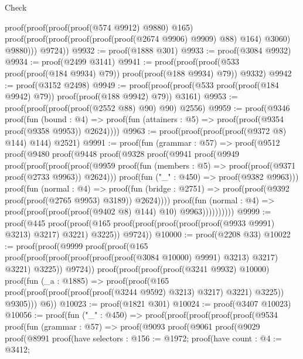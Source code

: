 \begin{lexlean}{Check}
\begin{coremodule}
            proof(proof(proof(proof(@574 @9912) @9880) @165)
                proof(proof(proof(proof(proof(proof(@2674 @9906) @9909) @88) @164) @3060) @9880)))
          @9724))
@9932 := proof(@1888 @301)
@9933 := proof(@3084 @9932)
@9934 := proof(@2499 @3141)
@9941 := proof(proof(proof(@533 proof(proof(@184 @9934) @79)) proof(proof(@188 @9934) @79)) @9332)
@9942 := proof(@3152 @2498)
@9949 := proof(proof(proof(@533 proof(proof(@184 @9942) @79)) proof(proof(@188 @9942) @79)) @3161)
@9953 := proof(proof(proof(proof(@2552 @88) @90) @90) @2556)
@9959 := proof(@9346
      proof(fun (bound : @4) =>
        proof(fun (attainers : @5) => proof(proof(@9354 proof(@9358 @9953)) @2624))))
@9963 := proof(proof(proof(proof(@9372 @8) @144) @144) @2521)
@9991 := proof(fun (grammar : @57) =>
    proof(@9512
        proof(@9480
            proof(@9448
                proof(@9328
                    proof(@9941
                        proof(@9949
                            proof(proof(proof(proof(@9959
                                      proof(fun (members : @5) =>
                                        proof(proof(@9371 proof(@2733 @9963)) @2624)))
                                    proof(fun ("_" : @450) => proof(@9382 @9963)))
                                  proof(fun (normal : @4) =>
                                    proof(fun (bridge : @2751) =>
                                      proof(proof(@9392 proof(proof(@2765 @9953) @3189)) @2624))))
                                proof(fun (normal : @4) =>
                                  proof(proof(proof(proof(@9402 @8) @144) @10) @9963))))))))))
@9999 := proof(@445
      proof(proof(@165 proof(proof(proof(proof(proof(@9933 @9991) @3213) @3217) @3221) @3225))
          @9724))
@10000 := proof(@2208 @33)
@10022 := proof(proof(@9999
        proof(proof(@165
              proof(proof(proof(proof(proof(proof(@3084 @10000) @9991) @3213) @3217) @3221) @3225))
            @9724))
      proof(proof(proof(proof(@3241 @9932) @10000)
            proof(fun (_a : @1885) =>
              proof(proof(@165
                    proof(proof(proof(proof(proof(@3244 @9592) @3213) @3217) @3221) @3225))
                  @9305)))
          @6))
@10023 := proof(@1821 @301)
@10024 := proof(@3407 @10023)
@10056 := proof(fun ("_" : @450) =>
    proof(proof(proof(proof(proof(@9534
                proof(fun (grammar : @57) =>
                  proof(@9093
                      proof(@9061
                          proof(@9029
                              proof(@8991
                                  proof(have selectors : @156 := @1972;
                                    proof(have count : @4 := @3412;

\end{coremodule}
\end{lexlean}

